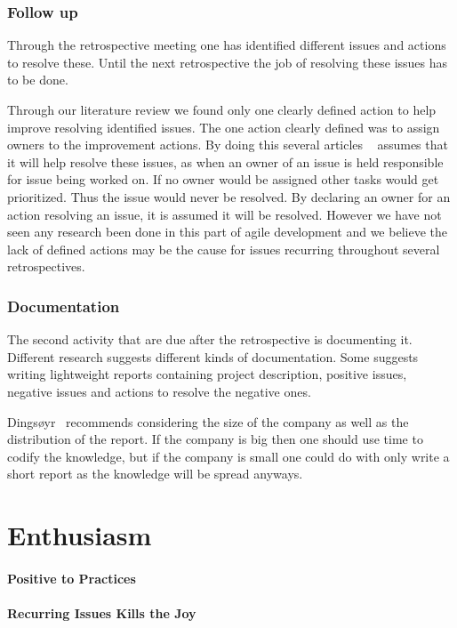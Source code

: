 \documentclass[12pt]{article}
\begin{document}
\subsubsection{Follow up}
Through the retrospective meeting one has identified different issues and actions to resolve these. Until the next retrospective the job of resolving these issues has to be done. 

Through our literature review we found only one clearly defined action to help improve resolving identified issues. The one action clearly defined was to assign owners to the improvement actions. By doing this several articles ~\cite{Collier1996,Drury2012} assumes that it will help resolve these issues, as when an owner of an issue is held responsible for issue being worked on. If no owner would be assigned other tasks would get prioritized. Thus the issue would never be resolved. By declaring an owner for an action resolving an issue, it is assumed it will be resolved. However we have not seen any research been done in this part of agile development and we believe the lack of defined actions may be the cause for issues recurring throughout several retrospectives. 

\subsubsection{Documentation}
The second activity that are due after the retrospective is documenting it. Different research suggests different kinds of documentation. Some suggests ~\cite{Collier1996} writing lightweight reports containing project description, positive issues, negative issues and actions to resolve the negative ones. 

Dingsøyr~\cite{Dingsoyr2005} recommends considering the size of the company as well as the distribution of the report. If the company is big then one should use time to codify the knowledge, but if the company is small one could do with only write a short report as the knowledge will be spread anyways. 

\section{Enthusiasm}

\paragraph{Positive to Practices}

\paragraph{Recurring Issues Kills the Joy}
\end{document}
